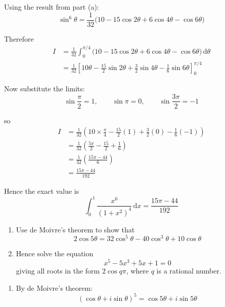 \documentclass[leqno]{article}
\begin{document}
\begin{enumerate}[
  label=\textbf{\arabic*.},
  leftmargin=*,
  topsep=0pt,
  partopsep=0pt,
  parsep=0pt
]
\begin{djsSolution}
\begin{enumerate}[label=\textbf{(\alph*)}]
  Using the result from part (a):
  \[
  \sin^6\theta=\frac{1}{32}\bigl(10-15\cos2\theta+6\cos4\theta-\cos6\theta\bigr)
  \]

  Therefore
  \begin{align*}
  I
  &=\frac{1}{32}\int_0^{\pi/4}\bigl(10-15\cos2\theta+6\cos4\theta-\cos6\theta\bigr)\,\mathrm{d}\theta \\
  &=\frac{1}{32}\left[10\theta-\frac{15}{2}\sin2\theta+\frac{3}{2}\sin4\theta-\frac{1}{6}\sin6\theta\right]_0^{\pi/4}
  \end{align*}

  Now substitute the limits:
  \[
  \sin\frac{\pi}{2}=1,\qquad \sin\pi=0,\qquad \sin\frac{3\pi}{2}=-1
  \]

  so
  \begin{align*}
  I
  &=\frac{1}{32}\left(10\times\frac{\pi}{4}-\frac{15}{2}(1)+\frac{3}{2}(0)-\frac{1}{6}(-1)\right) \\
  &=\frac{1}{32}\left(\frac{5\pi}{2}-\frac{15}{2}+\frac{1}{6}\right) \\
  &=\frac{1}{32}\left(\frac{15\pi-44}{6}\right) \\
  &=\frac{15\pi-44}{192}
  \end{align*}

  Hence the exact value is
  \[
  \int_0^1 \frac{x^6}{(1+x^2)^4}\,\mathrm{d}x=\frac{15\pi-44}{192}
  \]
\end{enumerate}
\end{djsSolution}


\newpage

\questionitem

\begin{enumerate}[label=\textbf{(\alph*)}]
  \item Use de Moivre's theorem to show that
  \[
  2\cos 5\theta = 32\cos^5\theta - 40\cos^3\theta + 10\cos\theta
  \]
  \item Hence solve the equation
  \[
  x^5 - 5x^3 + 5x + 1 = 0
  \]
  giving all roots in the form $2\cos q\pi$, where $q$ is a rational number.  \\
\end{enumerate}

\vspace*{10pt}

\begin{djsSolution}
\begin{enumerate}[label=\textbf{(\alph*)}]
  \item By de Moivre's theorem:
\[
(\cos\theta+i\sin\theta)^5=\cos5\theta+i\sin5\theta
\]


\end{enumerate}
\end{djsSolution}
\end{enumerate}
\end{document}
